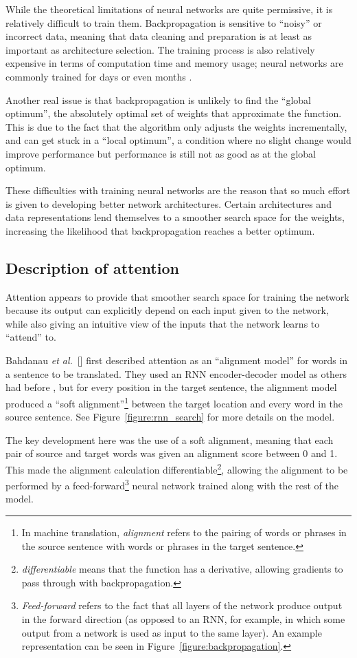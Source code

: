 \documentclass{article}
\newcommand{\etal}{\textit{et al.}}
\begin{document}
While the theoretical limitations of neural networks are quite permissive, it is relatively difficult to train them. Backpropagation is sensitive to ``noisy'' or incorrect data, meaning that data cleaning and preparation is at least as important as architecture selection. The training process is also relatively expensive in terms of computation time and memory usage; neural networks are commonly trained for days or even months \cite{attn_all_you_need}.

Another real issue is that backpropagation is unlikely to find the ``global optimum'', the absolutely optimal set of weights that approximate the function. This is due to the fact that the algorithm only adjusts the weights incrementally, and can get stuck in a ``local optimum'', a condition where no slight change would improve performance but performance is still not as good as at the global optimum.

These difficulties with training neural networks are the reason that so much effort is given to developing better network architectures. Certain architectures and data representations lend themselves to a smoother search space for the weights, increasing the likelihood that backpropagation reaches a better optimum.

\subsection{Description of attention}

Attention appears to provide that smoother search space for training the network because its output can explicitly depend on each input given to the network, while also giving an intuitive view of the inputs that the network learns to ``attend'' to.

Bahdanau \etal~[\citeyear{joint_align_translate}] first described attention as an ``alignment model'' for words in a sentence to be translated. They used an RNN encoder-decoder model as others had before \cite{encoder_decoders}, but for every position in the target sentence, the alignment model produced a ``soft alignment''\footnote{In machine translation, \textit{alignment} refers to the pairing of words or phrases in the source sentence with words or phrases in the target sentence.} between the target location and every word in the source sentence. See Figure~\ref{figure:rnn_search} for more details on the model.

The key development here was the use of a soft alignment, meaning that each pair of source and target words was given an alignment score between 0 and 1. This made the alignment calculation differentiable\footnote{\textit{differentiable} means that the function has a derivative, allowing gradients to pass through with backpropagation.}, allowing the alignment to be performed by a feed-forward\footnote{\textit{Feed-forward} refers to the fact that all layers of the network produce output in the forward direction (as opposed to an RNN, for example, in which some output from a network is used as input to the same layer). An example representation can be seen in Figure~\ref{figure:backpropagation}.} neural network trained along with the rest of the model.
\end{document}
